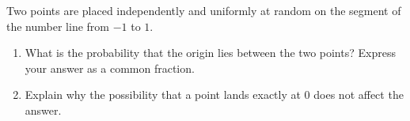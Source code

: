 Two points are placed independently and uniformly at random on the segment of the number line from $-1$ to $1$.
\begin{enumerate}
\item[(a)] What is the probability that the origin lies between the two points? Express your answer as a common fraction.
\item[(b)] Explain why the possibility that a point lands exactly at $0$ does not affect the answer.
\end{enumerate}
